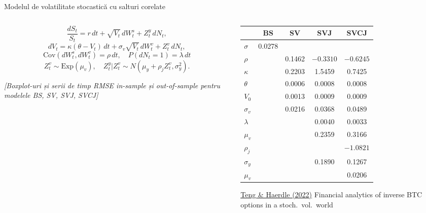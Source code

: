 \documentclass[9pt, aspectratio=169, t]{beamer}
\theoremstyle{definition}
\newcommand{\Cov}{\text{Cov}}
\begin{document}
\begin{frame}{Modelul de volatilitate stocastică cu salturi corelate}
\begin{columns}[T]
\begin{column}{0.55\textwidth}
\[
\frac{dS_t}{S_t} = r\,dt + \sqrt{V_t}\,dW_t^s + Z_t^y\,dN_t,
\]
\[
dV_t = \kappa(\theta - V_t)\,dt + \sigma_v\sqrt{V_t}\,dW_t^v + Z_t^v\,dN_t,
\]
\[
\Cov(dW_t^s, dW_t^v) = \rho\,dt, \quad P(dN_t = 1) = \lambda\,dt
\]
\[
Z_t^v \sim \text{Exp}(\mu_v), \quad Z_t^y | Z_t^v \sim N(\mu_y + \rho_j Z_t^v, \sigma_y^2).
\]

\vspace{0.3cm}

{\small\textit{[Boxplot-uri și serii de timp RMSE in-sample și out-of-sample pentru modelele BS, SV, SVJ, SVCJ]}}
\end{column}
\begin{column}{0.42\textwidth}
{\small
\begin{tabular}{lcccc}
\toprule
 & BS & SV & SVJ & SVCJ \\
\midrule
$\sigma$ & 0.0278 & & & \\
$\rho$ & & 0.1462 & $-0.3310$ & $-0.6245$ \\
$\kappa$ & & 0.2203 & 1.5459 & 0.7425 \\
$\theta$ & & 0.0006 & 0.0008 & 0.0008 \\
$V_0$ & & 0.0013 & 0.0009 & 0.0009 \\
$\sigma_v$ & & 0.0216 & 0.0368 & 0.0489 \\
$\lambda$ & & & 0.0040 & 0.0033 \\
$\mu_v$ & & & 0.2359 & 0.3166 \\
$\rho_j$ & & & & $-1.0821$ \\
$\sigma_y$ & & & 0.1890 & 0.1267 \\
$\mu_v$ & & & & 0.0206 \\
\bottomrule
\end{tabular}
}

\vspace{0.2cm}

{\scriptsize \href{https://doi.org/10.1016/j.frl.2021.102483}{\underline{Teng \& Haerdle (2022)}} Financial analytics of inverse BTC options in a stoch.\ vol.\ world}
\end{column}
\end{columns}
\end{frame}
\end{document}
